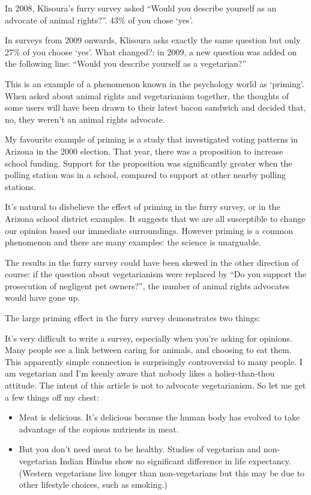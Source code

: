
In 2008, Klisoura’s furry survey asked ``Would you describe yourself as an advocate of animal rights?''. 43\% of you chose `yes'.

In surveys from 2009 onwards, Klisoura asks exactly the same question but only 27\% of you choose `yes'. What changed?: in 2009, a new question was added on the following line: ``Would you describe yourself as a vegetarian?''

This is an example of a phenomenon known in the psychology world as `priming'. When asked about animal rights and vegetarianism together, the thoughts of some users will have been drawn to their latest bacon sandwich and decided that, no, they weren't an animal rights advocate.

My favourite example of priming is a study that investigated voting patterns in Arizona in the 2000 election. That year, there was a proposition to increase school funding. Support for the proposition was significantly greater when the polling station was in a school, compared to support at other nearby polling stations.

It's natural to disbelieve the effect of priming in the furry survey, or in the Arizona school district examples. It suggests that we are all susceptible to change our opinion based our immediate surroundings. However priming is a common phenomenon and there are many examples: the science is unarguable.

The results in the furry survey could have been skewed in the other direction of course: if the question about vegetarianism were replaced by ``Do you support the prosecution of negligent pet owners?'', the number of animal rights advocates would have gone up.

The large priming effect in the furry survey demonstrates two things:

It's very difficult to write a survey, especially when you're asking for opinions.
Many people see a link between caring for animals, and choosing to eat them. This apparently simple connection is surprisingly controversial to many people.
I am vegetarian and I'm keenly aware that nobody likes a holier-than-thou attitude. The intent of this article is not to advocate vegetarianism. So let me get a few things off my chest:

\begin{itemize}
  \item Meat is delicious. It's delicious because the human body has evolved to take advantage of the copious nutrients in meat.
  \item But you don't need meat to be healthy. Studies of vegetarian and non-vegetarian Indian Hindus show no significant difference in life expectancy. (Western vegetarians live longer than non-vegetarians but this may be due to other lifestyle choices, such as smoking.)
\end{itemize}

